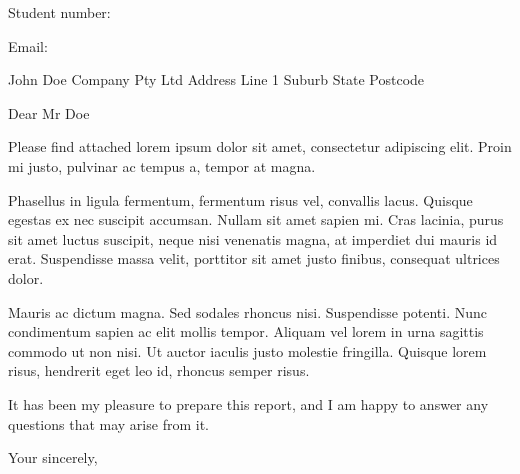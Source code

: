 \thispagestyle{empty}						%
\makeatletter 								%
\begin{adjustwidth}{200pt}{}
\noindent
\@author

\noindent
Student number: \usqstudentnumber{}

\noindent
Email: \usqstudentemail{}

\vspace{0.5cm}
\end{adjustwidth}

{\setlength{\parskip}{1.3ex plus 0.5ex minus 0.3ex}
\begin{flushleft}
\textbf{\@date}

\vspace{0.8cm}
John Doe\newline
Company Pty Ltd\newline
Address Line 1\newline
Suburb State Postcode

\vspace{0.8cm}
Dear Mr Doe
\end{flushleft}

Please find attached lorem ipsum dolor sit amet, consectetur adipiscing elit. Proin mi justo, pulvinar ac tempus a, tempor at magna.

Phasellus in ligula fermentum, fermentum risus vel, convallis lacus. Quisque egestas ex nec suscipit accumsan. Nullam sit amet sapien mi. Cras lacinia, purus sit amet luctus suscipit, neque nisi venenatis magna, at imperdiet dui mauris id erat. Suspendisse massa velit, porttitor sit amet justo finibus, consequat ultrices dolor.

Mauris ac dictum magna. Sed sodales rhoncus nisi. Suspendisse potenti. Nunc condimentum sapien ac elit mollis tempor. Aliquam vel lorem in urna sagittis commodo ut non nisi. Ut auctor iaculis justo molestie fringilla. Quisque lorem risus, hendrerit eget leo id, rhoncus semper risus.

It has been my pleasure to prepare this report, and I am happy to answer any questions that may arise from it.

\noindent
Your sincerely,

\vspace{2cm}
\noindent
\@author
}
\makeatother